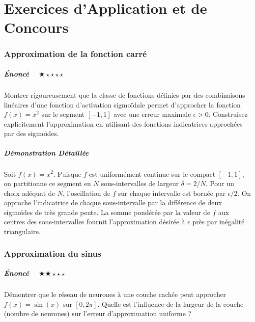 \documentclass[11pt,a4paper]{article}
\begin{document}
\newpage
\part{Exercices d'Application et de Concours}
\section{Approximation de la fonction carré}

\subsubsection{Énoncé $\quad \bigstar\star\star\star\star$}

Montrer rigoureusement que la classe de fonctions définies par des combinaisons linéaires d'une fonction d'activation sigmoïdale permet d'approcher la fonction $f(x) = x^2$ sur le segment $[-1, 1]$ avec une erreur maximale $\epsilon > 0$. Construisez explicitement l'approximation en utilisant des fonctions indicatrices approchées par des sigmoïdes.

\subsubsection{Démonstration Détaillée}

Soit $f(x) = x^2$. Puisque $f$ est uniformément continue sur le compact $[-1, 1]$, on partitionne ce segment en $N$ sous-intervalles de largeur $\delta = 2/N$. Pour un choix adéquat de $N$, l'oscillation de $f$ sur chaque intervalle est bornée par $\epsilon/2$. On approche l'indicatrice de chaque sous-intervalle par la différence de deux sigmoïdes de très grande pente. La somme pondérée par la valeur de $f$ aux centres des sous-intervalles fournit l'approximation désirée à $\epsilon$ près par inégalité triangulaire.


\section{Approximation du sinus}

\subsubsection{Énoncé $\quad \bigstar\bigstar\star\star\star$}

Démontrer que le réseau de neurones à une couche cachée peut approcher $f(x) = \sin(x)$ sur $[0, 2\pi]$. Quelle est l'influence de la largeur de la couche (nombre de neurones) sur l'erreur d'approximation uniforme ?
\end{document}
